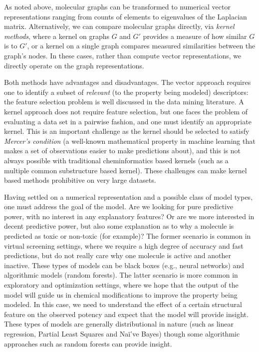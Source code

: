 \documentclass{sig-alternate}
\begin{document}
As noted above, molecular graphs can be transformed to numerical
vector representations ranging from counts of elements to eigenvalues
of the Laplacian matrix.  Alternatively, we can compare molecular
graphs directly, via \emph{kernel methods}, where a kernel on graphs
$G$ and $G'$ provides a measure of how similar $G$ is to $G'$, or a
kernel on a single graph compares measured similarities between the
graph's nodes. In these cases, rather than compute vector
representations, we directly operate on the graph representations.

Both methods have advantages and disadvantages. The vector approach
requires one to identify a subset of \emph{relevant} (to the property
being modeled) descriptors: the feature selection problem is
well discussed in the data mining literature. A kernel approach
does not require feature selection, but one faces the problem of
evaluating a data set in a pairwise fashion, and one must
identify an appropriate kernel. This is an important challenge as the
kernel should be selected to satisfy \emph{Mercer's condition} (a
well-known mathematical property in machine learning that makes a set
of observations easier to make predictions about), and this is not
always possible with traditional cheminformatics based kernels (such
as a multiple common substructure based kernel). These challenges can
make kernel based methods prohibitive on very large datasets.

Having settled on a numerical representation and a possible class of
model types, one must address the goal of the model. Are we looking
for pure predictive power, with no interest in any explanatory
features? Or are we more interested in decent predictive power, but
also some explanation as to why a molecule is predicted as toxic or
non-toxic (for example)? The former scenario is common in virtual
screening settings, where we require a high degree of accuracy and
fast predictions, but do not really care why one molecule is active
and another inactive. These types of models can be black boxes (e.g.,
neural networks) and algorithmic models \cite{Breiman:2001fk} (random
forests). The latter scenario is more common in exploratory and
optimization settings, where we hope that the output of the model will
guide us in chemical modifications to improve the property being
modeled.  In this case, we need to understand the effect of a certain
structural feature on the observed potency and expect that the model
will provide insight. These types of models are generally
distributional in nature (such as linear regression, Partial Least
Squares and Na\"{i'}ve Bayes) though some algorithmic approaches such
as random forests can provide insight.
\end{document}
